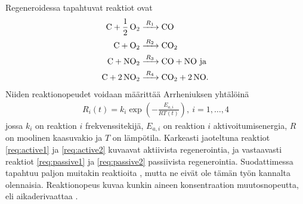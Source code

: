 Regeneroidessa tapahtuvat reaktiot ovat  
\begin{align}
    \ce{C + 1/2 O2 &->[$R_1$] CO }    \label{req:active1}\\
    \ce{C + O2 &->[$R_2$] CO2}    \label{req:active2}\\
    \ce{C + NO2 &->[$R_3$] CO +  NO} \text{ ja }  \label{req:passive1} \\
    \ce{C + 2 NO2 &->[$R_4$] CO2 + 2 NO}.    \label{req:passive2}  \\
\end{align}
Niiden reaktionopeudet voidaan määrittää Arrheniuksen yhtälöinä \cite{LiuGuanlin2021Roio} \cite{Penghao_regen}
\begin{align}
    R_i(t) =  k_i \exp\left({-\frac{E_{a,i}}{RT(t)}}\right),\ i = 1,\ldots,4
\end{align}
jossa \(k_i\) on reaktion \(i\) frekvenssitekijä, \(E_{a, i}\) on  reaktion \(i\) aktivoitumisenergia, \(R\) on moolinen kaasuvakio ja \(T\) on lämpötila. Karkeasti jaoteltuna reaktiot \eqref{req:active1} ja \eqref{req:active2} kuvaavat aktiivista regenerointia, ja vastaavasti reaktiot \eqref{req:passive1} ja \eqref{req:passive2} passiivista regenerointia.
Suodattimessa tapahtuu paljon muitakin reaktioita \cite{Penghao_regen}, mutta ne eivät ole tämän työn kannalta olennaisia.
Reaktionopeus kuvaa kunkin aineen konsentraation muutosnopeutta, eli aikaderivaattaa \cite[s. 24-26]{chemical_reaction_kinetics}. 




